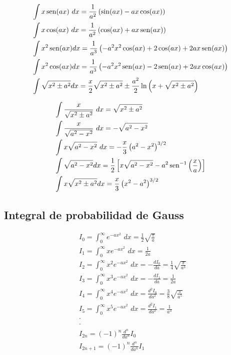 \begin{minipage}[c]{0.5\textwidth}
\begin{align*}
& \int x\operatorname{sen} (ax)\,\,dx = \frac{1}{a^2} \left( \sin(ax) -ax\cos(ax) \right)\\
& \int x\cos (ax)\,\,dx = \frac{1}{a^2} \left( \cos(ax) +ax\operatorname{sen}(ax) \right)\\
& \int x^2\operatorname{sen} (ax)dx = \frac{1}{a^3} \left(-a^2x^2 \cos(ax) +2\cos(ax) + 2ax\operatorname{sen}(ax) \right)\\
& \int x^2\cos (ax)dx = \frac{1}{a^3} \left(-a^2x^2 \operatorname{sen}(ax) -2\operatorname{sen}(ax) + 2ax\cos(ax) \right)\\
& \int \sqrt{x^2\pm a^2}dx =  \frac{x}{2}\sqrt{x^2 \pm a^2} \pm \frac{a^2}{2}\ln \left( x+\sqrt{x^2\pm a^2} \right)
\end{align*}
\end{minipage}
\begin{minipage}[c]{0.5\textwidth}
\begin{align*}
& \int \frac{x}{\sqrt{x^2 \pm a^2}}\,\,dx = \sqrt{x^2\pm a^2}\\
& \int \frac{x}{\sqrt{a^2-x^2}}\,\,dx = -\sqrt{a^2-x^2}\\
& \int x\sqrt{a^2-x^2}\,\,dx = -\frac{x}{3} \left( a^2-x^2 \right)^{3/2} \\
& \int \sqrt{a^2-x^2}dx = \frac{1}{2} \left[ x\sqrt{a^2-x^2} -a^2\operatorname{sen}^{-1}\left(\frac{x}{a} \right) \right] \\
& \int x\sqrt{x^2\pm a^2}dx = \frac{x}{3} \left( x^2-a^2 \right)^{3/2}
\end{align*}
\end{minipage}
\subsection*{Integral de probabilidad de Gauss}
\begin{align*}
& I_0 = \int_0^\infty e^{-ax^2}\,\, dx = \frac{1}{2}\sqrt{\frac{\pi}{a}}\\
& I_1 = \int_0^\infty xe^{-ax^2}\,\, dx = \frac{1}{2a}\\
& I_2 = \int_0^\infty x^2e^{-ax^2}\,\, dx = -\frac{dI_0}{da}= \frac{1}{4}\sqrt{\frac{\pi}{a^3}}\\
& I_3 = \int_0^\infty x^3e^{-ax^2}\,\, dx =-\frac{dI_1}{da}= \frac{1}{2a} \\
& I_4 = \int_0^\infty x^4e^{-ax^2}\,\, dx = \frac{d^2I_0}{da^2}= \frac{3}{8}\sqrt{\frac{\pi}{a^5}}\\
& I_5 = \int_0^\infty x^5e^{-ax^2}\,\, dx = \frac{d^2I_1}{da^2}= \frac{1}{a^3}\\
& \cdot\\
& \cdot\\
& I_{2n} = (-1)^n\frac{d^n}{da^n}I_0\\
& I_{2n+1} = (-1)^n\frac{d^n}{da^n}I_1
\end{align*}